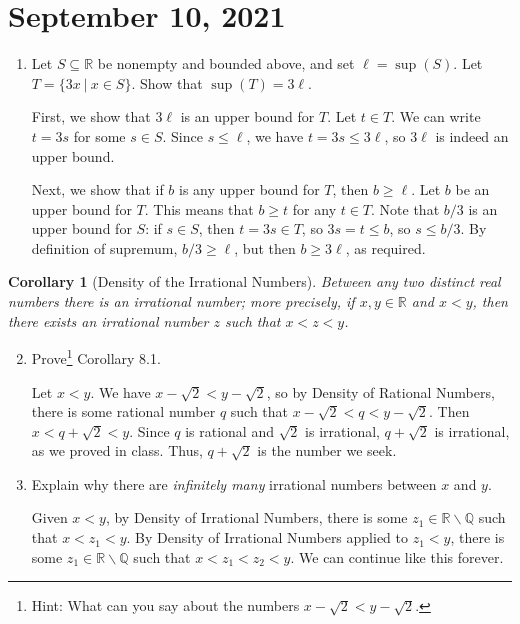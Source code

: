 \documentclass[12pt]{amsart}
\newcommand{\Q}{\mathbb{Q}}
\newcommand{\R}{{\mathbb{R}}}
\numberwithin{equation}{section}
\theoremstyle{plain} %
\newtheorem{cor}[equation]{Corollary}
\newcommand{\Sept}[1]{\section{September #1, 2021}}
\theoremstyle{definition}
\theoremstyle{remark}
\begin{document}
\Sept{10}

\begin{enumerate}

\item Let $S\subseteq \R$ be nonempty and bounded above, and set $\ell=\sup(S)$. Let $T=\{3x \ | \ x\in S\}$. Show that $\sup(T)=3\ell$.

\begin{framed} First, we show that $3\ell$ is an upper bound for $T$. Let $t\in T$. We can write $t=3s$ for some $s\in S$. Since $s\leq \ell$, we have $t=3s\leq 3\ell$, so $3\ell$ is indeed an upper bound.

Next, we show that if $b$ is any upper bound for $T$, then $b\geq \ell$. Let $b$ be an upper bound for $T$. This means that $b\geq t$ for any $t\in T$. Note that $b/3$ is an upper bound for $S$: if $s\in S$, then $t=3s\in T$, so $3s=t\leq b$, so $s\leq b/3$. By definition of supremum, $b/3\geq \ell$, but then $b\geq 3\ell$, as required.
\end{framed}

\end{enumerate}

\begin{cor}[Density of the Irrational Numbers] 
Between any two distinct real numbers there is an irrational number; more precisely, if $x,y \in \R$ and $x < y$, then there exists an irrational number $z$ such that $x < z < y$.
\end{cor}

\begin{enumerate}\setcounter{enumi}{1}
\item Prove\footnote{Hint: What can you say about the numbers $x-\sqrt{2} < y-\sqrt{2}$.} Corollary 8.1.

\begin{framed}
Let $x< y$. We have $x-\sqrt{2}<y-\sqrt{2}$, so by Density of Rational Numbers, there is some rational number $q$ such that $x-\sqrt{2} < q < y-\sqrt{2}$. Then $x< q+\sqrt{2} < y$. Since $q$ is rational and $\sqrt{2}$ is irrational, $q+\sqrt{2}$ is irrational, as we proved in class. Thus, $q+\sqrt{2}$ is the number we seek.
\end{framed}

\item Explain why there are \emph{infinitely many} irrational numbers between $x$ and $y$.

\begin{framed}
Given $x<y$, by Density of Irrational Numbers, there is some $z_1\in \R\smallsetminus\Q$ such that $x<z_1 < y$. By Density of Irrational Numbers applied to $z_1<y$, there is some $z_1\in \R\smallsetminus\Q$ such that $x<z_1 < z_2 < y$. We can continue like this forever.
\end{framed}
\end{enumerate}
\end{document}
